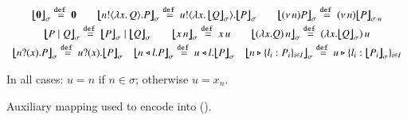 \begin{figure}[t!]
\[%
	\begin{array}{c}
		\auxmapp{\inact}{{}}{\sigma}  \defeq  \inact
		\qquad \auxmapp{\bout{n}{\abs{x}{Q}} P}{{}}{\sigma} \defeq \bout{u}{\abs{x}{\auxmapp{Q}{{}}{\sigma}}} \auxmapp{P}{{}}{\sigma}
		\qquad
		\auxmapp{\news{n} P}{{}}{\sigma} \defeq \news{n} \auxmapp{P}{{}}{{\sigma \cat n}}
		\\[1mm]

		\auxmapp{P \Par Q}{{}}{\sigma} \defeq \auxmapp{P}{{}}{\sigma} \Par \auxmapp{Q}{{}}{\sigma} 
		\qquad
		\auxmapp{\appl{x}{n}}{{}}{\sigma} \defeq \appl{x}{u}
		\qquad
		\auxmapp{\appl{(\lambda x.Q)}{n}}{{}}{\sigma}  \defeq \appl{(\lambda x.\auxmapp{Q}{{}}{\sigma})}{u}
		\\[1mm]
		\auxmapp{\binp{n}{x} P}{{}}{\sigma} \defeq \binp{u}{x} \auxmapp{P}{{}}{\sigma} 
		\quad
		\auxmapp{\bsel{n}{l} P}{{}}{\sigma} \defeq \bsel{u}{l} \auxmapp{P}{{}}{\sigma} 
		\quad
		\auxmapp{\bbra{n}{l_i:P_i}_{i \in I}}{{}}{\sigma} \defeq \bbra{u}{l_i:\auxmapp{P_i}{{}}{\sigma}}_{i \in I}
	\end{array}
\]
\begin{center}
	{In all cases: $u = n$ if $n\in \sigma$; otherwise $u = x_n$.}
\end{center}
\vspace{-3mm}
\caption{\label{f:auxmap} Auxiliary mapping used to encode \HOp into \HO ().}
\vspace{-1mm}
\end{figure}

